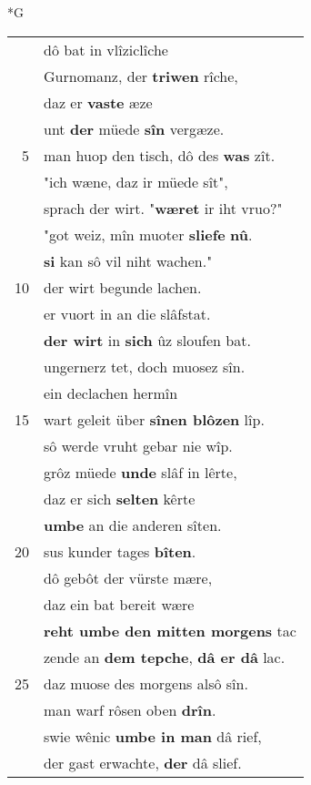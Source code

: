 \documentclass[8pt,a4paper,notitlepage]{article}
\begin{document}
\begin{table}[ht]
\begin{minipage}[t]{0.5\linewidth}
\small
\begin{center}*G
\end{center}
\begin{tabular}{rl}
 & dô bat in vlîziclîche\\ 
 & Gurnomanz, der \textbf{triwen} rîche,\\ 
 & daz er \textbf{vaste} æze\\ 
 & unt \textbf{der} müede \textbf{sîn} vergæze.\\ 
5 & man huop den tisch, dô des \textbf{was} zît.\\ 
 & "ich wæne, daz ir müede sît",\\ 
 & sprach der wirt. "\textbf{wæret} ir iht vruo?"\\ 
 & "got weiz, mîn muoter \textbf{sliefe} \textbf{nû}.\\ 
 & \textbf{si} kan sô vil niht wachen."\\ 
10 & der wirt begunde lachen.\\ 
 & er vuort in an die slâfstat.\\ 
 & \textbf{der wirt} in \textbf{sich} ûz sloufen bat.\\ 
 & ungernerz tet, doch muosez sîn.\\ 
 & ein declachen hermîn\\ 
15 & wart geleit über \textbf{sînen blôzen} lîp.\\ 
 & sô werde vruht gebar nie wîp.\\ 
 & grôz müede \textbf{unde} slâf in lêrte,\\ 
 & daz er sich \textbf{selten} kêrte\\ 
 & \textbf{umbe} an die anderen sîten.\\ 
20 & sus kunder tages \textbf{bîten}.\\ 
 & dô gebôt der vürste mære,\\ 
 & daz ein bat bereit wære\\ 
 & \textbf{reht umbe den mitten morgens} tac\\ 
 & zende an \textbf{dem tepche}, \textbf{dâ er dâ} lac.\\ 
25 & daz muose des morgens alsô sîn.\\ 
 & man warf rôsen oben \textbf{drîn}.\\ 
 & swie wênic \textbf{umbe in man} dâ rief,\\ 
 & der gast erwachte, \textbf{der} dâ slief.\\ 

\end{tabular}
\end{minipage}
\end{table}
\end{document}
